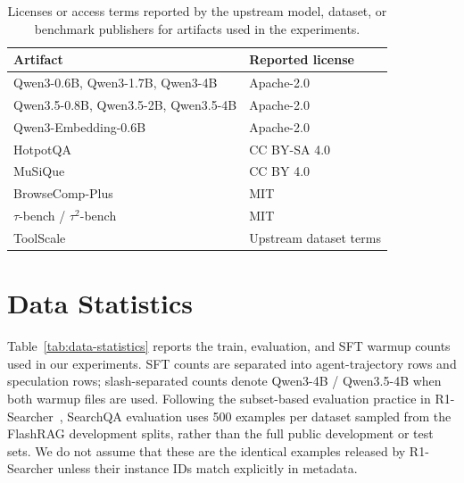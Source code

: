 \begin{table}[h]
\centering
\small
\setlength{\tabcolsep}{4pt}
\begin{tabular}{@{}p{}p{}@{}}
\toprule
Artifact & Reported license \\
\midrule
Qwen3-0.6B, Qwen3-1.7B, Qwen3-4B &
Apache-2.0 \\
Qwen3.5-0.8B, Qwen3.5-2B, Qwen3.5-4B &
Apache-2.0 \\
Qwen3-Embedding-0.6B &
Apache-2.0 \\
HotpotQA &
CC BY-SA 4.0 \\
MuSiQue &
CC BY 4.0 \\
BrowseComp-Plus &
MIT \\
$\tau$-bench / $\tau^2$-bench &
MIT \\
ToolScale &
Upstream dataset terms \\
\bottomrule
\end{tabular}
\caption{Licenses or access terms reported by the upstream model, dataset, or
benchmark publishers for artifacts used in the experiments.}
\label{tab:artifact-licenses}
\end{table}

\section{Data Statistics}
\label{sec:appendix:data-statistics}

Table~\ref{tab:data-statistics} reports the train, evaluation, and SFT warmup
counts used in our experiments. SFT counts are separated into agent-trajectory
rows and speculation rows; slash-separated counts denote Qwen3-4B / Qwen3.5-4B
when both warmup files are used. Following the subset-based evaluation practice
in R1-Searcher~\citep{song2025r1searcher}, SearchQA evaluation uses
500 examples per dataset sampled from the FlashRAG development splits, rather
than the full public development or test sets. We do not assume that these are
the identical examples released by R1-Searcher unless their instance IDs match
explicitly in metadata.

